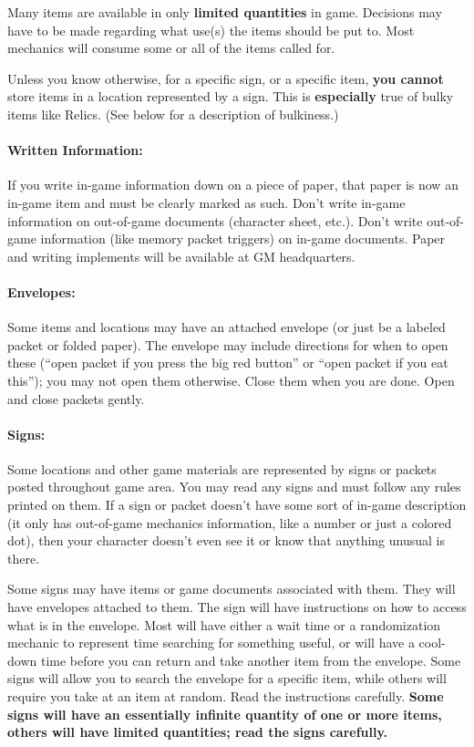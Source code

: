 \documentclass[sheet]{GL2020}
\begin{document}
Many items are available in only \textbf{limited quantities} in game. Decisions may have to be made regarding what use(s) the items should be put to. Most mechanics will consume some or all of the items called for.

Unless you know otherwise, for a specific sign, or a specific item, \textbf{you cannot} store items in a location represented by a sign. This is \textbf{especially} true of bulky items like Relics. (See below for a description of bulkiness.)

\paragraph{Written Information:} If you write in-game information down on a piece of paper, that paper is now an in-game item and must be clearly marked as such. Don't write in-game information on out-of-game documents (character sheet, etc.). Don't write out-of-game information (like memory packet triggers) on in-game documents. Paper and writing implements will be available at GM headquarters.

\paragraph{Envelopes:} Some items and locations may have an attached envelope (or just be a labeled packet or folded paper). The envelope may include directions for when to open these (``open packet if you press the big red button'' or ``open packet if you eat this''); you may not open them otherwise.  Close them when you are done.  Open and close packets gently.

\paragraph{Signs:} Some locations and other game materials are represented by signs or packets posted throughout game area. You may read any signs and must follow any rules printed on them. If a sign or packet doesn't have some sort of in-game description (it only has out-of-game mechanics information, like a number or just a colored dot), then your character doesn't even see it or know that anything unusual is there.

Some signs may have items or game documents associated with them. They will have envelopes attached to them. The sign will have instructions on how to access what is in the envelope. Most will have either a wait time or a randomization mechanic to represent time searching for something useful, or will have a cool-down time before you can return and take another item from the envelope. Some signs will allow you to search the envelope for a specific item, while others will require you take at an item at random. Read the instructions carefully. \textbf{Some signs will have an essentially infinite quantity of one or more items, others will have limited quantities; read the signs carefully.}
\end{document}
